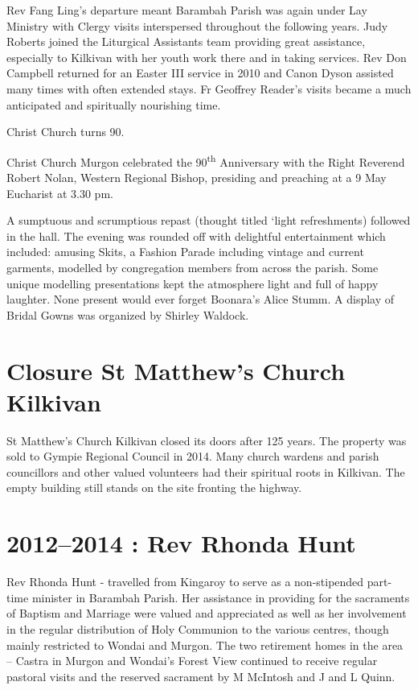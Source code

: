 Rev Fang Ling's departure meant Barambah Parish was again under Lay Ministry with Clergy visits interspersed throughout the following years. Judy Roberts joined the Liturgical Assistants team providing great assistance, especially to Kilkivan with her youth work there and in taking services. Rev Don Campbell returned for an Easter III service in 2010 and Canon Dyson assisted many times with often extended stays. Fr Geoffrey Reader's visits became a much anticipated and spiritually nourishing time.

Christ Church turns 90.

Christ Church Murgon celebrated the 90\textsuperscript{th} Anniversary with the Right Reverend Robert Nolan, Western Regional Bishop, presiding and preaching at a 9 May Eucharist at 3.30 pm.

A sumptuous and scrumptious repast (thought titled `light refreshments) followed in the hall. The evening was rounded off with delightful entertainment which included: amusing Skits, a Fashion Parade including vintage and current garments, modelled by congregation members from across the parish. Some unique modelling presentations kept the atmosphere light and full of happy laughter. None present would ever forget Boonara's Alice Stumm. A display of Bridal Gowns was organized by Shirley Waldock.

\hypertarget{closure-st-matthews-church-kilkivan}{%
\section{Closure St Matthew's Church Kilkivan}\label{closure-st-matthews-church-kilkivan}}

St Matthew's Church Kilkivan closed its doors after 125 years. The property was sold to Gympie Regional Council in 2014. Many church wardens and parish councillors and other valued volunteers had their spiritual roots in Kilkivan. The empty building still stands on the site fronting the highway.

\hypertarget{rev-rhonda-hunt}{%
\section{2012--2014 : Rev Rhonda Hunt}\label{rev-rhonda-hunt}}

Rev Rhonda Hunt - travelled from Kingaroy to serve as a non-stipended part-time minister in Barambah Parish. Her assistance in providing for the sacraments of Baptism and Marriage were valued and appreciated as well as her involvement in the regular distribution of Holy Communion to the various centres, though mainly restricted to Wondai and Murgon. The two retirement homes in the area -- Castra in Murgon and Wondai's Forest View continued to receive regular pastoral visits and the reserved sacrament by M McIntosh and J and L Quinn.

